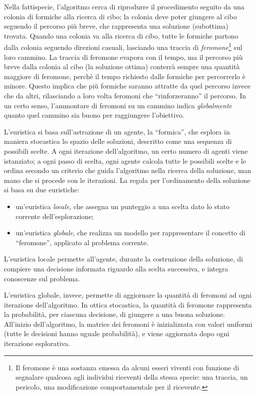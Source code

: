 Nella fattispecie, l'algoritmo cerca di riprodurre il procedimento seguito da una colonia di 
formiche alla ricerca di cibo; la colonia deve poter giungere al cibo seguendo 
il percorso più breve, che rappresenta una soluzione (subottima) trovata.
Quando una colonia va alla ricerca di cibo, tutte le formiche partono dalla 
colonia seguendo direzioni casuali, lasciando una traccia di 
\emph{feromone}\footnote{Il feromone è una sostanza emessa da alcuni esseri 
viventi con funzione di segnalare qualcosa agli individui riceventi 
della stessa specie: una traccia, un pericolo, una modificazione 
comportamentale per il ricevente.} sul loro cammino. La traccia di feromone 
evapora con il tempo, ma il percorso più breve dalla colonia al cibo (la soluzione ottima) conterrà 
sempre una quantit\`a maggiore di feromone, perch\`e il tempo richiesto dalle formiche
per percorrerlo \`e minore. Questo implica che pi\`u formiche saranno attratte da
quel percorso invece che da altri, rilasciando a loro volta feromoni che
``rinforzeranno'' il percorso. In un certo senso, l'ammontare di feromoni su un cammino
indica \emph{globalmente} quanto quel cammino sia buono per raggiungere l'obiettivo.

L'euristica si basa sull'astrazione di un agente, la ``formica'', che esplora
in maniera stocastica lo spazio delle soluzioni, descritto come una sequenza di possibili scelte.
A ogni iterazione dell'algoritmo, un certo numero di agenti viene istanziato;
a ogni passo di scelta, ogni agente calcola tutte le possibili scelte e le ordina secondo un
criterio che guida l'algoritmo nella ricerca della soluzione, man mano che si procede con
le iterazioni. La regola per l'ordinamento della soluzione si basa su due euristiche:
\begin{itemize}
  \item un'euristica \emph{locale}, che assegna un punteggio a una scelta dato
    lo stato corrente dell'esplorazione;
  \item un'euristica \emph{globale}, che realizza un modello per rappresentare il concetto
    di ``feromone'', applicato al problema corrente.
\end{itemize}
L'euristica locale permette all'agente, durante la costruzione della soluzione,
di compiere una decisione informata riguardo alla scelta successiva, e integra conoscenze
sul problema.

L'euristica globale, invece, permette di aggiornare la quantit\`a di feromoni
ad ogni iterazione dell'algoritmo.
In ottica stocastica, la quantità di feromone rappresenta la probabilità, per 
ciascuna decisione, di giungere a una buona soluzione.
All'inizio dell'algoritmo, la matrice dei feromoni è inizializzata con valori uniformi 
(tutte le decisioni hanno uguale probabilità), e viene aggiornata dopo ogni
iterazione esplorativa.

